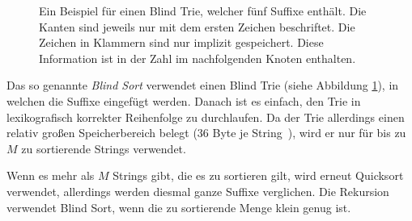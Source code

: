 \begin{figure}[!ht]
\centering
\newcommand{\tnode}{\node[draw,circle]}
\newcommand{\trans}{\draw[-stealth]}
\caption[Beispiel für einen Blind Trie]{Ein Beispiel für einen Blind Trie, welcher fünf Suffixe enthält. Die Kanten sind jeweils nur mit dem ersten Zeichen beschriftet. Die Zeichen in Klammern sind nur implizit gespeichert. Diese Information ist in der Zahl im nachfolgenden Knoten enthalten.}
\label{fg:blindtrie}
\end{figure}

Das so genannte \textit{Blind Sort} verwendet einen Blind Trie (siehe Abbildung \ref{fg:blindtrie}),
in welchen die Suffixe eingefügt werden.
Danach ist es einfach, den Trie in lexikografisch korrekter Reihenfolge zu durchlaufen.
Da der Trie allerdings einen relativ großen Speicherbereich belegt (36 Byte je String~\cite{saca:4}),
wird er nur für bis zu $M$ zu sortierende Strings verwendet.

Wenn es mehr als $M$ Strings gibt, die es zu sortieren gilt, wird erneut Quicksort~\cite{ternary_quicksort} verwendet, allerdings werden diesmal ganze Suffixe verglichen.
Die Rekursion verwendet Blind Sort, wenn die zu sortierende Menge klein genug ist.

